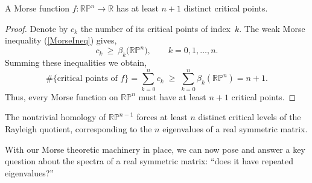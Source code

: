 \begin{proposition}\label{prop:MorseCPs}
A Morse function $f:\mathbb{RP}^{n}\to\mathbb R$ has at least $n+1$ distinct critical points.
\end{proposition}
\begin{proof}
Denote by $c_{k}$ the number of its critical points of index~$k$. The weak Morse inequality (\ref{MorseIneq}) gives,
\[
   c_{k}\ \ge\ \beta_{k}\bigl(\mathbb{RP}^{n}\bigr),
   \qquad k=0,1,\dots,n .
\]
Summing these inequalities we obtain,
\begin{equation}\label{MorseIneqRPn}
    \#\{\text{critical points of }f\}
   =\sum_{k=0}^{n} c_{k}
   \;\ge\;
   \sum_{k=0}^{n} \beta_{k}(\mathbb{RP}^{n})
   = n+1.
\end{equation}
Thus, every Morse function on $\mathbb{RP}^{n}$ must have at least $n+1$ critical points.
\end{proof}
\begin{remark}
The nontrivial homology of $\mathbb{RP}^{n-1}$ forces at least $n$ distinct critical levels of the Rayleigh quotient, corresponding to the $n$ eigenvalues of a real symmetric matrix.
\end{remark}


\noindent With our Morse theoretic machinery in place, we can now pose and answer a key question about the spectra of a real symmetric matrix: “does it have repeated eigenvalues?”



